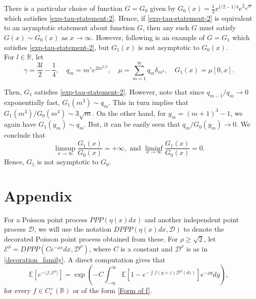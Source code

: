 \documentclass[a4paper,reqno]{amsart}%
\newcommand{\1}{\mathbf 1}
\theoremstyle{mine}
\numberwithin{theorem}{section}
\numberwithin{equation}{section}
\theoremstyle{remark}
\begin{document}
There is a particular choice of function $G = G_0$ given by $G_0(x) = \frac{1}{3}x^{l/2 -1/4}e^{2\sqrt{x}}$ which satisfies \eqref{exp-tau-statement-2}. Hence, if \eqref{exp-tau-statement-2} is equivalent to an asymptotic statement about function $G$, then any such $G$ must satisfy $G(x) \sim G_0(x)$ as $x\to \infty$. However, following is an example of $G = G_1$ which satisfies \eqref{exp-tau-statement-2}, but $G_1(x)$ is not asymptotic to $G_0(x)$. \\

For $l \in \mathbb{R}$, let
\[
    \gamma=\frac{3l}{2}-\frac14,\quad
    q_m=m^\gamma e^{2m^{3/2}},\quad \mu = \sum_{m=1}^\infty q_m\delta_{m^3}, \quad
    G_1(x)= \mu[0,x].
\]

Then, $G_1$ satisfies \eqref{exp-tau-statement-2}. However, note that since $q_{m-1}/q_m \to 0 $ exponentially fast, $G_1(m^3) \sim q_m$. This in turn implies that $G_1(m^3)/G_0(m^3) \sim 3 \sqrt{m}$. On the other hand, for $y_m = (m+1)^3 -1$, we again have $G_1(y_m) \sim q_m$. But, it can be easily seen that $q_m/G_0(y_m) \to 0$. We conclude that 
\[ \limsup_{x\to \infty} \frac{G_1(x)}{G_0(x)} = +\infty, \textrm{ and } \liminf_{x\to \infty} \frac{G_1(x)}{G_0(x)} = 0.\]
Hence, $G_1$ is not asymptotic to $G_0$. 




\section{Appendix} \label{Section Appendix}



For a Poisson point process $PPP(\eta(x)dx)$ and another independent point process $\mathcal{D}$, we will use the notation $DPPP(\eta(x)dx, \mathcal{D})$ to denote the decorated Poisson point process obtained from these.
For $\rho \geq \sqrt{2}$, let $\mathcal{E}^{\rho}= DPPP(Ce^{-\rho x}dx, \mathcal D^{\rho})$, where $C$ is a constant and $\mathcal{D}^\rho$ is as in \eqref{decoration_family}. A direct computation gives that
    \begin{equation}\label{Laplace_DPPP} 
    \mathbb{E}[e^{-\langle f,\mathcal{E}^{\rho}\rangle}] = \exp\left(-C\int_{-\infty}^{\infty} \mathbb E[1-e^{-\int f(y+z)\mathcal{D}^{\rho}(dz)}]e^{-\rho y}dy\right),
\end{equation}
for every $f\in C_{c}^{+}(\mathbb{R})$ or of the form \eqref{Form of f}.
\end{document}
